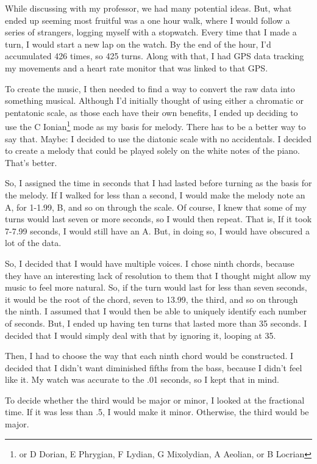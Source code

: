 \documentclass[12pt]{article}[titlepage]
\newcommand{\1}{\={a}}
\newcommand{\2}{\={e}}
\newcommand{\3}{\={\i}}
\newcommand{\4}{\=o}
\newcommand{\5}{\=u}
\newcommand{\6}{\={A}}
\renewcommand{\,}{\textsuperscript{,}}
\begin{document}
While discussing with my professor, we had many potential ideas.
But, what ended up seeming most fruitful was a one hour walk, where I would follow a series of strangers, logging myself with a stopwatch.
Every time that I made a turn, I would start a new lap on the watch.
By the end of the hour, I'd accumulated 426 times, so 425 turns.
Along with that, I had GPS data tracking my movements and a heart rate monitor that was linked to that GPS.

To create the music, I then needed to find a way to convert the raw data into something musical.
Although I'd initially thought of using either a chromatic or pentatonic scale, as those each have their own benefits, I ended up deciding to use the C Ionian\footnote{or D Dorian, E Phrygian, F Lydian, G Mixolydian, A Aeolian, or B Locrian} mode as my basis for melody.
There has to be a better way to say that.
Maybe: I decided to use the diatonic scale with no accidentals.
I decided to create a melody that could be played solely on the white notes of the piano.
That's better.

So, I assigned the time in seconds that I had lasted before turning as the basis for the melody.
If I walked for less than a second, I would make the melody note an A, for 1-1.99, B, and so on through the scale.
Of course, I knew that some of my turns would last seven or more seconds, so I would then repeat.
That is, If it took 7-7.99 seconds, I would still have an A.
But, in doing so, I would have obscured a lot of the data.

So, I decided that I would have multiple voices. 
I chose ninth chords, because they have an interesting lack of resolution to them that I thought might allow my music to feel more natural.
So, if the turn would last for less than seven seconds, it would be the root of the chord, seven to 13.99, the third, and so on through the ninth.
I assumed that I would then be able to uniquely identify each number of seconds.
But, I ended up having ten turns that lasted more than 35 seconds.
I decided that I would simply deal with that by ignoring it, looping at 35.

Then, I had to choose the way that each ninth chord would be constructed.
I decided that I didn't want diminished fifths from the bass, because I didn't feel like it.
My watch was accurate to the .01 seconds, so I kept that in mind.

To decide whether the third would be major or minor, I looked at the fractional time.
If it was less than .5, I would make it minor.
Otherwise, the third would be major.
\end{document}

